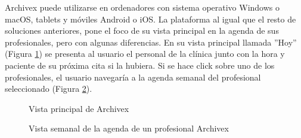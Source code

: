 Archivex puede utilizarse en ordenadores con sistema operativo Windows o macOS, tablets y móviles Android o iOS. La plataforma al igual que el resto de soluciones anteriores, pone el foco de su vista principal en la agenda de sus profesionales, pero con algunas diferencias. En su vista principal llamada ''Hoy'' (Figura \ref{fig:archivex-principal}) se presenta al usuario el personal de la clínica junto con la hora y paciente de su próxima cita si la hubiera. Si se hace click sobre uno de los profesionales, el usuario navegaría a la agenda semanal del profesional seleccionado (Figura \ref{fig:archivex-agenda-profesional}). 

\begin{figure}[H]
    \caption{Vista principal de Archivex}
    \label{fig:archivex-principal}
\end{figure}

\begin{figure}[H]
    \caption{Vista semanal de la agenda de un profesional Archivex}
    \label{fig:archivex-agenda-profesional}
\end{figure}

